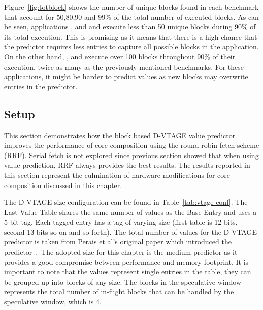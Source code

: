 Figure~\ref{fig:totblock} shows the number of unique blocks found in each benchmark that account for 50,80,90 and 99\% of the total number of executed blocks.
As can be seen, applications ,  and   and  execute less than 50 unique blocks during 90\% of its total execution.
This is promising as it means that there is a high chance that the predictor requires less entries to capture all possible blocks in the application.
On the other hand, , and  execute over 100 blocks throughout 90\% of their execution, twice as many as the previously mentioned benchmarks.
For these applications, it might be harder to predict values as new blocks may overwrite entries in the predictor.


\subsection{Setup}
This section demonstrates how the block based D-VTAGE value predictor improves the performance of core composition using the round-robin fetch scheme (RRF).
Serial fetch is not explored since previous section showed that when using value prediction, RRF always provides the best results.
The results reported in this section represent the culmination of hardware modifications for core composition discussed in this chapter.

The D-VTAGE size configuration can be found in Table~\ref{tab:vtage-conf}.
The Last-Value Table shares the same number of values as the Base Entry and uses a 5-bit tag.
Each tagged entry has a tag of varying size (first table is 12 bits, second 13 bits so on and so forth).
The total number of values for the D-VTAGE predictor is taken from Perais et al's original paper which introduced the predictor~\cite{peraisBeBop2015}.\
The adopted size for this chapter is the medium predictor as it provides a good compromise between performance and memory footprint.
It is important to note that the values represent single entries in the table, they can be grouped up into blocks of any size.
The blocks in the speculative window represents the total number of in-flight blocks that can be handled by the speculative window, which is 4.

